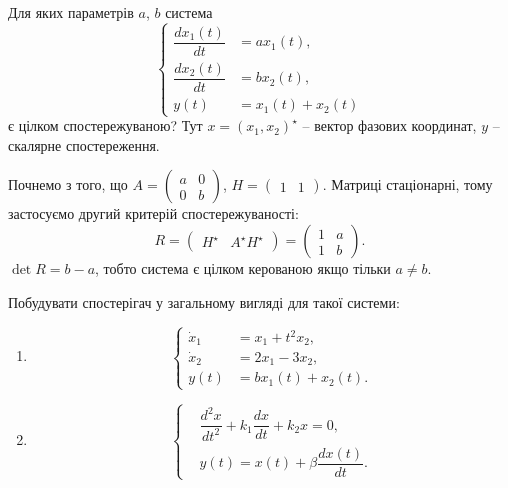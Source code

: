 \begin{problem}
    Для яких параметрів $a$, $b$ система
    \begin{equation*}
        \left\{
            \begin{aligned}
                \dfrac{dx_1(t)}{dt} &= ax_1(t), \\
                \dfrac{dx_2(t)}{dt} &= bx_2(t), \\
                y(t) &= x_1(t) + x_2(t)
            \end{aligned}
        \right.
    \end{equation*}
    є цілком спостережуваною? Тут $x = (x_1, x_2)^\star$ -- вектор фазових координат, $y$ -- скалярне спостереження.
\end{problem}

\begin{solution}
    Почнемо з того, що $A = \begin{pmatrix} a & 0 \\ 0 & b \end{pmatrix}$, $H = \begin{pmatrix} 1 & 1 \end{pmatrix}$. Матриці стаціонарні, тому застосуємо другий критерій спостережуваності:
        \[ R = \begin{pmatrix} H^\star & A^\star H^\star \end{pmatrix} = \begin{pmatrix} 1 & a \\ 1 & b \end{pmatrix}. \]
        $\det R = b - a$, тобто система є цілком керованою якщо тільки $a \ne b$.
\end{solution}

\begin{problem}
    Побудувати спостерігач у загальному вигляді для такої системи:
    \begin{enumerate}
        \item \begin{equation*}
            \left\{
                \begin{aligned}
                    \dot x_1 &= x_1 + t^2 x_2, \\
                    \dot x_2 &= 2x_1 - 3x_2, \\
                    y(t) &= bx_1(t) + x_2(t).
                \end{aligned}
            \right.
        \end{equation*}
        \item \begin{equation*}
            \left\{
                \begin{aligned}
                    & \dfrac{d^2x}{dt^2} + k_1 \dfrac{dx}{dt} + k_2 x = 0, \\
                    & y(t) = x(t) + \beta \dfrac{dx(t)}{dt}.
                \end{aligned}
            \right.
        \end{equation*}
    \end{enumerate}
\end{problem}

